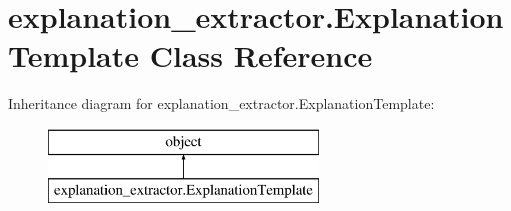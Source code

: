 \hypertarget{classexplanation__extractor_1_1_explanation_template}{}\section{explanation\+\_\+extractor.\+Explanation\+Template Class Reference}
\label{classexplanation__extractor_1_1_explanation_template}
Inheritance diagram for explanation\+\_\+extractor.\+Explanation\+Template\+:\begin{figure}[H]
\begin{center}
\leavevmode
\includegraphics[height=2.000000cm]{classexplanation__extractor_1_1_explanation_template}
\end{center}
\end{figure}
